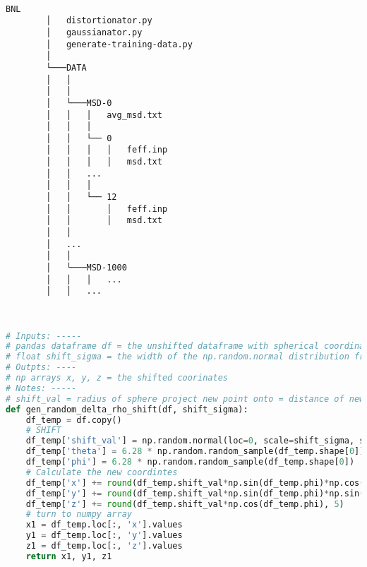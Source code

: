 \begin{minipage}{\linewidth}
    ~ \\
    \begin{Verbatim}[samepage=false]
        BNL
        │   distortionator.py
        │   gaussianator.py
        │   generate-training-data.py
        │       
        └───DATA
        │   │       
        │   │
        │   └───MSD-0
        │   │   │   avg_msd.txt
        │   │   │
        │   │   └── 0
        │   │   │   │   feff.inp
        │   │   │   │   msd.txt
        │   │   ...
        │   │   │
        │   │   └── 12
        │   │       │   feff.inp
        │   │       │   msd.txt
        │   │       
        │   ...
        │   │
        │   └───MSD-1000
        │   │   │   ...
        │   │   ...

    \end{Verbatim}
    ~
    \end{minipage}

\pagebreak
\begin{lstlisting}[language=Python]
# Inputs: -----
# pandas dataframe df = the unshifted dataframe with spherical coordinates
# float shift_sigma = the width of the np.random.normal distribution from which shift distances are chosen
# Outpts: ----
# np arrays x, y, z = the shifted coorinates
# Notes: -----
# shift_val = radius of sphere project new point onto = distance of new disordered atom from original location
def gen_random_delta_rho_shift(df, shift_sigma):
    df_temp = df.copy()
    # SHIFT
    df_temp['shift_val'] = np.random.normal(loc=0, scale=shift_sigma, size=df_temp.shape[0])
    df_temp['theta'] = 6.28 * np.random.random_sample(df_temp.shape[0])
    df_temp['phi'] = 6.28 * np.random.random_sample(df_temp.shape[0])
    # Calculate the new coordintes
    df_temp['x'] += round(df_temp.shift_val*np.sin(df_temp.phi)*np.cos(df_temp.theta), 5)
    df_temp['y'] += round(df_temp.shift_val*np.sin(df_temp.phi)*np.sin(df_temp.theta), 5)
    df_temp['z'] += round(df_temp.shift_val*np.cos(df_temp.phi), 5)
    # turn to numpy array
    x1 = df_temp.loc[:, 'x'].values
    y1 = df_temp.loc[:, 'y'].values
    z1 = df_temp.loc[:, 'z'].values
    return x1, y1, z1
\end{lstlisting}

